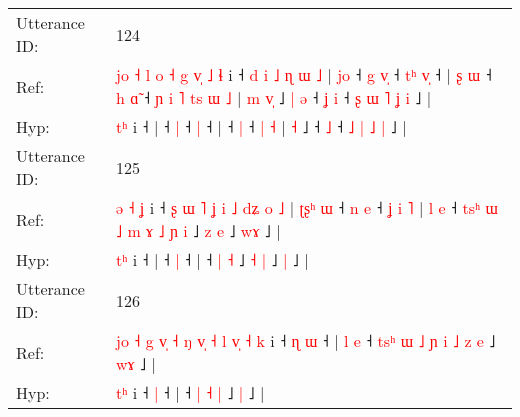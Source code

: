 \documentclass[10pt]{article}
\DeclareRobustCommand{\hl}[1]{{\textcolor{red}{#1}}}
\begin{document}
\begin{longtable}{ll}
 \\
\midrule
Utterance ID: & 124 \\
Ref: & \hl{j}\hl{o}\hl{ }\hl{˧}\hl{ }\hl{l}\hl{ }\hl{o}\hl{ }\hl{˧}\hl{ }\hl{g}\hl{ }\hl{v}\hl{̩}\hl{ }\hl{˩}\hl{ }\hl{ɬ} i ˧\hl{ }\hl{d}\hl{ }\hl{i}\hl{ }\hl{˩}\hl{ }\hl{ɳ}\hl{ }\hl{ɯ}\hl{ }\hl{˩} |\hl{ }\hl{j}\hl{o} ˧\hl{ }\hl{g} \hl{v}\hl{̩} ˧\hl{ }\hl{t}\hl{ʰ} \hl{v}\hl{̩} ˧ |\hl{ }\hl{ʂ}\hl{ }\hl{ɯ} ˧\hl{ }\hl{h} \hl{ɑ}\hl{̃} ˧\hl{ }\hl{ɲ}\hl{ }\hl{i}\hl{ }\hl{˥}\hl{ }\hl{t}\hl{s} \hl{ɯ} \hl{˩} |\hl{ }\hl{m} \hl{v}\hl{̩} ˩\hl{ }\hl{|}\hl{ }\hl{ə} ˧\hl{ }\hl{ʝ} \hl{i} ˧\hl{ }\hl{ʂ} \hl{ɯ} \hl{˥} \hl{ʝ} \hl{i} ˩ |
 \\
Hyp: & \hl{}\hl{}\hl{}\hl{}\hl{}\hl{}\hl{}\hl{}\hl{}\hl{}\hl{}\hl{}\hl{}\hl{}\hl{}\hl{}\hl{}\hl{t}\hl{ʰ} i ˧\hl{}\hl{}\hl{}\hl{}\hl{}\hl{}\hl{}\hl{}\hl{}\hl{}\hl{}\hl{} |\hl{}\hl{}\hl{} ˧\hl{}\hl{} \hl{}\hl{|} ˧\hl{}\hl{}\hl{} \hl{}\hl{|} ˧ |\hl{}\hl{}\hl{}\hl{} ˧\hl{}\hl{} \hl{}\hl{|} ˧\hl{}\hl{}\hl{}\hl{}\hl{}\hl{}\hl{}\hl{}\hl{} \hl{|} \hl{˧} |\hl{}\hl{} \hl{}\hl{˧} ˩\hl{}\hl{}\hl{}\hl{} ˧\hl{}\hl{} \hl{˩} ˧\hl{}\hl{} \hl{˩} \hl{|} \hl{˩} \hl{|} ˩ |
 \\
\midrule
Utterance ID: & 125 \\
Ref: & \hl{ə}\hl{ }\hl{˧}\hl{ }\hl{ʝ} i ˧\hl{ }\hl{ʂ}\hl{ }\hl{ɯ}\hl{ }\hl{˥}\hl{ }\hl{ʝ}\hl{ }\hl{i}\hl{ }\hl{˩}\hl{ }\hl{d}\hl{ʑ}\hl{ }\hl{o}\hl{ }\hl{˩} |\hl{ }\hl{ʈ}\hl{ʂ}\hl{ʰ}\hl{ }\hl{ɯ} ˧\hl{ }\hl{n} \hl{e} ˧\hl{ }\hl{ʝ}\hl{ }\hl{i}\hl{ }\hl{˥} |\hl{ }\hl{l}\hl{ }\hl{e} ˧\hl{ }\hl{t}\hl{s}\hl{ʰ}\hl{ }\hl{ɯ}\hl{ }\hl{˩}\hl{ }\hl{m}\hl{ }\hl{ɤ}\hl{ }\hl{˩} \hl{ɲ} \hl{i} ˩ \hl{z} \hl{e} ˩ \hl{w}\hl{ɤ} ˩ |
 \\
Hyp: & \hl{}\hl{}\hl{}\hl{t}\hl{ʰ} i ˧\hl{}\hl{}\hl{}\hl{}\hl{}\hl{}\hl{}\hl{}\hl{}\hl{}\hl{}\hl{}\hl{}\hl{}\hl{}\hl{}\hl{}\hl{}\hl{} |\hl{}\hl{}\hl{}\hl{}\hl{}\hl{} ˧\hl{}\hl{} \hl{|} ˧\hl{}\hl{}\hl{}\hl{}\hl{}\hl{} |\hl{}\hl{}\hl{}\hl{} ˧\hl{}\hl{}\hl{}\hl{}\hl{}\hl{}\hl{}\hl{}\hl{}\hl{}\hl{}\hl{}\hl{}\hl{} \hl{|} \hl{˧} ˩ \hl{˧} \hl{|} ˩ \hl{}\hl{|} ˩ |
 \\
\midrule
Utterance ID: & 126 \\
Ref: & \hl{j}\hl{o}\hl{ }\hl{˧}\hl{ }\hl{g}\hl{ }\hl{v}\hl{̩}\hl{ }\hl{˧}\hl{ }\hl{ŋ}\hl{ }\hl{v}\hl{̩}\hl{ }\hl{˧}\hl{ }\hl{l}\hl{ }\hl{v}\hl{̩}\hl{ }\hl{˧}\hl{ }\hl{k} i ˧\hl{ }\hl{ɳ} \hl{ɯ} ˧ |\hl{ }\hl{l}\hl{ }\hl{e} ˧\hl{ }\hl{t}\hl{s}\hl{ʰ}\hl{ }\hl{ɯ}\hl{ }\hl{˩}\hl{ }\hl{ɲ}\hl{ }\hl{i} \hl{˩} \hl{z} \hl{e} ˩ \hl{w}\hl{ɤ} ˩ |
 \\
Hyp: & \hl{}\hl{}\hl{}\hl{}\hl{}\hl{}\hl{}\hl{}\hl{}\hl{}\hl{}\hl{}\hl{}\hl{}\hl{}\hl{}\hl{}\hl{}\hl{}\hl{}\hl{}\hl{}\hl{}\hl{}\hl{}\hl{t}\hl{ʰ} i ˧\hl{}\hl{} \hl{|} ˧ |\hl{}\hl{}\hl{}\hl{} ˧\hl{}\hl{}\hl{}\hl{}\hl{}\hl{}\hl{}\hl{}\hl{}\hl{}\hl{}\hl{} \hl{|} \hl{˧} \hl{|} ˩ \hl{}\hl{|} ˩ |

\end{longtable}
\end{document}

